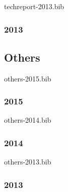 \begin{btSect}{techreport-2013.bib}
\subsubsection*{2013}\btPrintAll
\end{btSect}

\subsection*{Others}
\begin{btSect}{others-2015.bib}
\subsubsection*{2015}\btPrintAll
\end{btSect}

\begin{btSect}{others-2014.bib}
\subsubsection*{2014}\btPrintAll
\end{btSect}

\begin{btSect}{others-2013.bib}
\subsubsection*{2013}\btPrintAll
\end{btSect}

\let\jobname=\jobname@sav\makeatother
